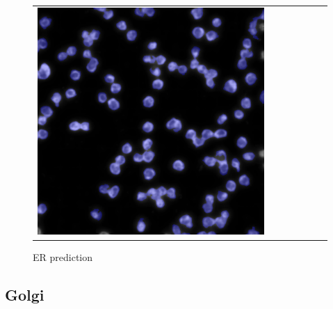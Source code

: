 \begin{figure}[H]
\begin{tabularx}{\textwidth}{YYYYYYY}
            \includegraphics{bilder/ER/segmentation/pp_7.png} 
        \end{tabularx}
    \caption{ER prediction}
    \label{fig:er-prediction}
\end{figure}


\subsection{Golgi}
